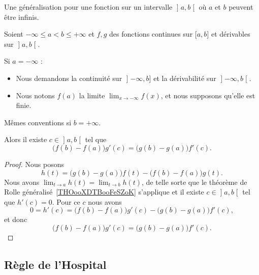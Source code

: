 Une généralisation pour une fonction sur un intervalle \( \mathopen] a , b \mathclose[\) où \( a\) et \( b\) peuvent être infinis.
\begin{theorem} \label{THOooRIIBooOjkzMa}
	Soient \( -\infty\leq a<b\leq +\infty\) et \( f,g\) des fonctions continues sur \( \mathopen[ a , b \mathclose]\) et dérivables sur \( \mathopen] a , b \mathclose[\).

		Si \( a=-\infty\) :
		\begin{itemize}
			\item Nous demandons la continuité sur \( \mathopen] -\infty , b \mathclose]\) et la dérivabilité sur \( \mathopen] -\infty , b \mathclose[\).
			\item
			      Nous notons \( f(a)\) la limite \( \lim_{x\to -\infty} f(x)\), et nous supposons qu'elle est finie.
		\end{itemize}

		Mêmes conventions si \( b=+\infty\).

		Alors il existe \( c\in \mathopen] a , b \mathclose[\) tel que
	\begin{equation}
		\big( f(b)-f(a) \big)g'(c)=\big( g(b)-g(a) \big)f'(c).
	\end{equation}

\end{theorem}


\begin{proof}
	Nous posons
	\begin{equation}
		h(t)=\big( g(b)-g(a) \big)f(t)-\big( f(b)-f(a) \big)g(t).
	\end{equation}
	Nous avons \( \lim_{t\to a} h(t)=\lim_{t\to b} h(t)\), de telle sorte que le théorème de Rolle généralisé~\ref{THOooXDTBooFeSZoK} s'applique et il existe \( c\in \mathopen] a , b \mathclose[\) tel que \( h'(c)=0\). Pour ce \( c\) nous avons
	\begin{equation}
		0=h'(c)=\big( f(b)-f(a) \big)g'(c)-\big( g(b)-g(a) \big)f'(c),
	\end{equation}
	et donc
	\begin{equation}
		\big( f(b)-f(a) \big)g'(c)=\big( g(b)-g(a) \big)f'(c).
	\end{equation}
\end{proof}

\subsection{Règle de l'Hospital}

